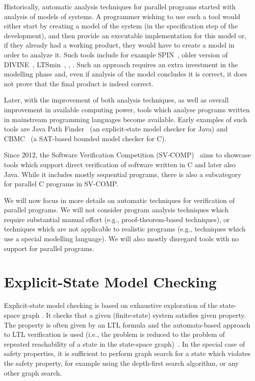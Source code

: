 Historically, automatic analysis techniques for parallel programs started with
analysis of models of systems.
A programmer wishing to use such a tool would either start by creating a model
of the system (in the specification step of the development), and then provide
an executable implementation for this model or, if they already had a working
product, they would have to create a model in order to analyze it.
Such tools include for example SPIN~\cite{Holzmann1997,Holzmann2004}, older version of DIVINE~\cite{BBCS05,BBCR10}, LTSmin~\cite{Kant2015}, \cite{uppall?}, \cite{TODO...}.
Such an approach requires an extra investment in the modelling phase and, even
if analysis of the model concludes it is correct, it does not prove that the
final product is indeed correct.

Later, with the improvement of both analysis techniques, as well as overall
improvement in available computing power, tools which analyse programs written
in mainstream programming languages become available.
Early examples of such tools are Java Path Finder~\cite{Visser2003} (an explicit-state model checker for Java) and CBMC~\cite{Clarke2004} (a SAT-based bounded model checker for C).

Since 2012, the Software Verification Competition (SV-COMP)~\cite{Beyer2020svc} aims
to showcase tools which support direct verification of software written in C
and later also Java.
While it includes mostly sequential programs, there is also a subcategory for
parallel C programs in SV-COMP.

We will now focus in more details on automatic techniques for verification of
parallel programs.
We will not consider program analysis techniques which require substantial manual effort (e.g., proof-theorem-based techniques), or techniques which are not applicable to realistic programs (e.g., techniques which use a special modelling language).
We will also mostly disregard tools with no support for parallel programs.

\section{Explicit-State Model Checking}

Explicit-state model checking is based on exhaustive exploration of the
state-space graph \cite{TODO}.
It checks that a given (finite-state) system satisfies given property.
The property is often given by an LTL formula and the automata-based approach
to LTL verification is used (i.e., the problem is reduced to the problem of
repeated reachability of a state in the state-space graph)~\cite{TODO}.
In the special case of safety properties, it is sufficient to perform graph
search for a state which violates the safety property, for example using the
depth-first search algorithm, or any other graph search.

